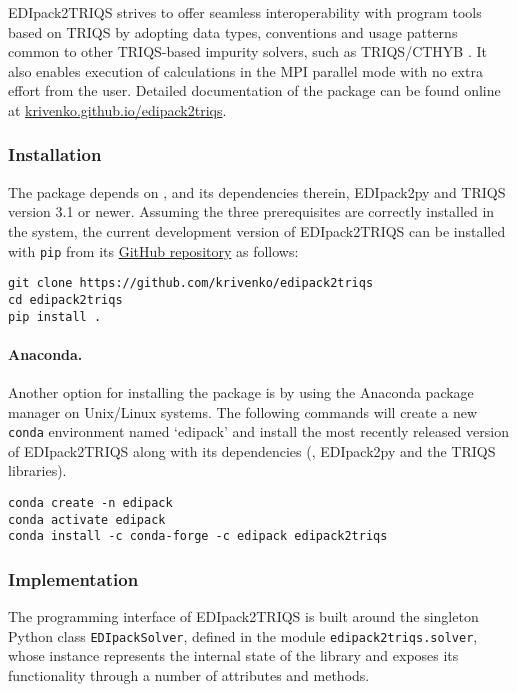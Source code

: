 \documentclass[edipack_sp.tex]{subfiles}
\begin{document}
EDIpack2TRIQS strives to offer seamless interoperability with program tools
based on TRIQS by adopting data types, conventions and usage patterns
common to other TRIQS-based impurity solvers, such as
TRIQS/CTHYB \cite{Seth2016CPC}. It also enables execution of \NAME calculations
in the MPI parallel mode with no extra effort from the user.
Detailed documentation of the package can be 
found online at \href{https://krivenko.github.io/edipack2triqs/}
{krivenko.github.io/edipack2triqs}.

\subsubsection{Installation}\label{sSecInteropTRIQSInstallation}
The package depends on \NAME, and its dependencies therein, EDIpack2py
and TRIQS version 3.1 or newer. Assuming the three prerequisites are correctly 
installed in the system, the current development version of EDIpack2TRIQS can be 
installed with {\tt pip} from its 
\href{https://github.com/krivenko/edipack2triqs}{GitHub repository} as follows:

\begin{lstlisting}[style=mybash]
git clone https://github.com/krivenko/edipack2triqs
cd edipack2triqs
pip install .
\end{lstlisting}

\paragraph{Anaconda.}
Another option for installing the package is by using the Anaconda package 
manager on Unix/Linux systems.
The following commands will create a new {\tt conda} environment named 
`edipack' and install the most recently released version of EDIpack2TRIQS along 
with its dependencies (\NAME, EDIpack2py and the TRIQS libraries).

\begin{lstlisting}[style=mybash]
conda create -n edipack
conda activate edipack
conda install -c conda-forge -c edipack edipack2triqs
\end{lstlisting}

\subsubsection{Implementation}\label{sSecInteropTRIQSImplementation}
The programming interface of EDIpack2TRIQS is built around the  
singleton Python class {\tt EDIpackSolver}, defined in the module
{\tt edipack2triqs.solver}, whose instance represents the internal state of 
the \NAME library and exposes its functionality through a number of 
attributes and methods.
\end{document}
